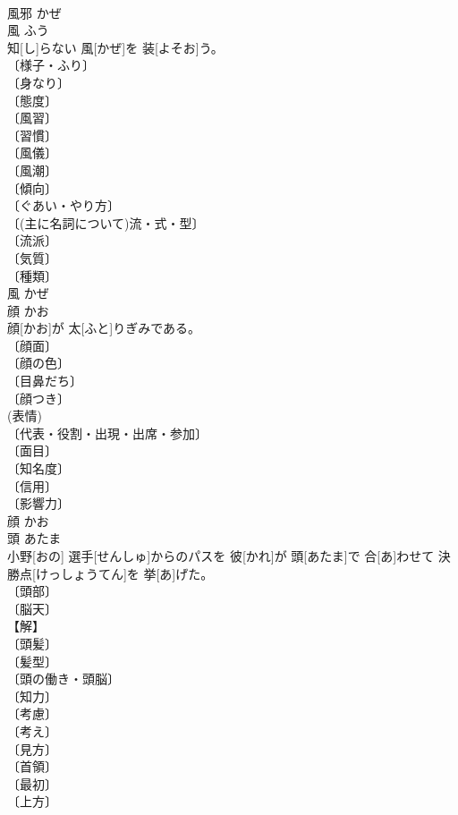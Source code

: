 \documentclass[8pt]{extreport}
\begin{document}
\begin{CJK}{UTF8}{min}
\\	風邪	かぜ	
\\	風	ふう	
\\	知[し]らない 風[かぜ]を 装[よそお]う。	
\\	〔様子・ふり〕 
\\	〔身なり〕 
\\	〔態度〕 
\\	〔風習〕 
\\	〔習慣〕 
\\	〔風儀〕 
\\	〔風潮〕 
\\	〔傾向〕 
\\	〔ぐあい・やり方〕 
\\	〔(主に名詞について)流・式・型〕 
\\	〔流派〕 
\\	〔気質〕 
\\	〔種類〕 
\\	風	かぜ	
\\	顔	かお	
\\	顔[かお]が 太[ふと]りぎみである。	
\\	〔顔面〕 
\\	〔顔の色〕 
\\	〔目鼻だち〕 
\\	〔顔つき〕 
\\	(表情) 
\\	〔代表・役割・出現・出席・参加〕 
\\	〔面目〕 
\\	〔知名度〕 
\\	〔信用〕 
\\	〔影響力〕 
\\	顔	かお	
\\	頭	あたま	
\\	小野[おの] 選手[せんしゅ]からのパスを 彼[かれ]が 頭[あたま]で 合[あ]わせて 決勝点[けっしょうてん]を 挙[あ]げた。	
\\	〔頭部〕 
\\	〔脳天〕 
\\	【解】 
\\	〔頭髪〕 
\\	〔髪型〕 
\\	〔頭の働き・頭脳〕 
\\	〔知力〕 
\\	〔考慮〕 
\\	〔考え〕 
\\	〔見方〕 
\\	〔首領〕 
\\	〔最初〕 
\\	〔上方〕 

\end{CJK}
\end{document}
